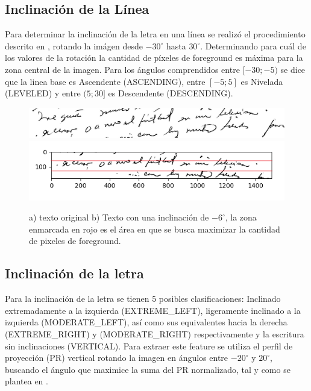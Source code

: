 \documentclass[10pt, a4paper]{article}
\begin{document}
        \subsection{Inclinaci\'on de la L\'inea}
            Para determinar la inclinaci\'on de la letra en una l\'inea se realiz\'o el procedimiento descrito en \cite{gavrilescu2018predicting}, rotando la im\'agen desde $-30^{\circ}$ hasta $30^{\circ}$. 
            Determinando para cu\'al de los valores de la rotaci\'on la cantidad de p\'ixeles de foreground es m\'axima para la zona central de la imagen. Para los \'angulos comprendidos 
            entre $ [-30; -5) $ se dice que la linea base es Ascendente (ASCENDING), entre $[-5; 5]$ es Nivelada (LEVELED) y entre $(5; 30]$ es Descendente (DESCENDING). 

            \begin{figure}[!h]
                \centering
                \includegraphics[width = 0.4\linewidth]{Judith_21.jpg}
                \includegraphics[width = 0.4\linewidth]{Baseline.png}
                \caption{a) texto original b) Texto con una inclinaci\'on de $-6^{\circ}$, la zona enmarcada en rojo es el \'area en que se busca maximizar 
                la cantidad de pixeles de foreground.}
            \end{figure}

        \subsection{Inclinaci\'on de la letra}
            Para la inclinaci\'on de la letra se tienen 5 posibles clasificaciones: Inclinado extremadamente a la izquierda (EXTREME\_LEFT), ligeramente inclinado a la 
            izquierda (MODERATE\_LEFT), as\'i como sus equivalentes hacia la derecha (EXTREME\_RIGHT) y (MODERATE\_RIGHT) respectivamente y la escritura sin inclinaciones (VERTICAL). 
            Para extraer este feature se utiliza el perfil de proyecci\'on (PR) vertical rotando la imagen en \'angulos entre $-20^{\circ}$ y $20^{\circ}$, buscando el \'angulo que maximice
            la suma del PR normalizado, tal y como se plantea en \cite{gavrilescu2018predicting}.
\end{document}

